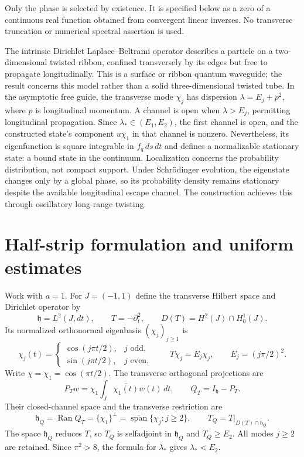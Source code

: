\documentclass[11pt,a4paper]{article}
\begin{document}
Only the phase is selected by existence. It is specified below as a zero
of a continuous real function obtained from convergent linear inverses.
No transverse truncation or numerical spectral assertion is used.

The intrinsic Dirichlet Laplace--Beltrami operator describes a particle
on a two-dimensional twisted ribbon, confined transversely by its edges
but free to propagate longitudinally. This is a surface or ribbon
quantum waveguide; the result concerns this model rather than a solid
three-dimensional twisted tube. In the asymptotic free guide, the
transverse mode $\chi_j$ has dispersion $\lambda=E_j+p^2$, where $p$
is longitudinal momentum. A channel is open when $\lambda>E_j$,
permitting longitudinal propagation. Since $\lambda_*\in(E_1,E_2)$,
the first channel is open, and the constructed state's component
$u\chi_1$ in that channel is nonzero. Nevertheless, its eigenfunction
is square integrable in $f_q\,ds\,dt$ and defines a normalizable
stationary state: a bound state in the continuum. Localization concerns
the probability distribution, not compact support. Under Schr\"odinger
evolution, the eigenstate changes only by a global phase, so its
probability density remains stationary despite the available
longitudinal escape channel. The construction achieves this through
oscillatory long-range twisting.

\section{Half-strip formulation and uniform estimates}

Work with $a=1$. For $J=(-1,1)$ define the transverse Hilbert space
and Dirichlet operator by
\[
 \mathfrak h=L^2(J,dt),\qquad T=-\partial_t^2,\qquad
 D(T)=H^2(J)\cap H_0^1(J).
\]
Its normalized orthonormal eigenbasis $(\chi_j)_{j\ge1}$ is
\[
 \chi_j(t)=
 \begin{cases}
  \cos(j\pi t/2),&j\text{ odd},\\
  \sin(j\pi t/2),&j\text{ even},
 \end{cases}
 \qquad T\chi_j=E_j\chi_j,\qquad E_j=(j\pi/2)^2.
\]
Write $\chi=\chi_1=\cos(\pi t/2)$. The transverse orthogonal projections are
\[
 P_Tw=\chi_1\int_J\overline{\chi_1(t)}w(t)\,dt,\qquad
 Q_T=I_{\mathfrak h}-P_T.
\]
Their closed-channel space and the transverse restriction are
\[
 \mathfrak h_Q=\operatorname{Ran}Q_T
 =\{\chi_1\}^{\perp}
 =\overline{\operatorname{span}}\{\chi_j:j\ge2\},\qquad
 T_Q=T\big|_{D(T)\cap\mathfrak h_Q}.
\]
The space $\mathfrak h_Q$ reduces $T$, so $T_Q$ is selfadjoint in
$\mathfrak h_Q$ and $T_Q\ge E_2$. All modes $j\ge2$ are retained.
Since $\pi^2>8$, the formula for $\lambda_*$ gives $\lambda_*<E_2$.
\end{document}

